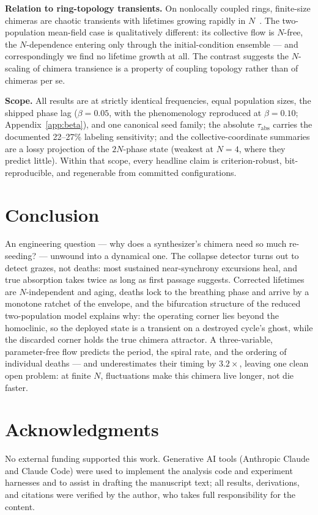 \documentclass[11pt]{article}
\begin{document}
\textbf{Relation to ring-topology transients.} On nonlocally coupled rings,
finite-size chimeras are chaotic transients with lifetimes growing rapidly in
$N$~\cite{wo2011}. The two-population mean-field case is qualitatively different:
its collective flow is $N$-free, the $N$-dependence entering only through the
initial-condition ensemble --- and correspondingly we find no lifetime growth at
all. The contrast suggests the $N$-scaling of chimera transience is a property of
coupling topology rather than of chimeras per se.

\textbf{Scope.} All results are at strictly identical frequencies, equal population
sizes, the shipped phase lag ($\beta = 0.05$, with the phenomenology reproduced at
$\beta = 0.10$; Appendix~\ref{app:beta}), and one canonical seed family; the absolute
$\tau_{\mathrm{abs}}$ carries the documented 22--27\% labeling sensitivity; and the
collective-coordinate summaries are a lossy projection of the $2N$-phase state
(weakest at $N = 4$, where they predict little). Within that scope, every headline
claim is criterion-robust, bit-reproducible, and regenerable from committed
configurations.

\section{Conclusion}\label{sec:conclusion}

An engineering question --- why does a synthesizer's chimera need so much
re-seeding? --- unwound into a dynamical one. The collapse detector turns out to
detect grazes, not deaths: most sustained near-synchrony excursions heal, and true
absorption takes twice as long as first passage suggests. Corrected lifetimes are
$N$-independent and aging, deaths lock to the breathing phase and arrive by a
monotone ratchet of the envelope, and the bifurcation structure of the reduced
two-population model explains why: the operating corner lies beyond the homoclinic,
so the deployed state is a transient on a destroyed cycle's ghost, while the
discarded corner holds the true chimera attractor. A three-variable, parameter-free
flow predicts the period, the spiral rate, and the ordering of individual deaths
--- and underestimates their timing by $3.2\times$, leaving one clean open problem:
at finite $N$, fluctuations make this chimera live longer, not die faster.

\section*{Acknowledgments}
No external funding supported this work. Generative AI tools (Anthropic Claude and
Claude Code) were used to implement the analysis code and experiment harnesses and
to assist in drafting the manuscript text; all results, derivations, and citations
were verified by the author, who takes full responsibility for the content.
\end{document}
